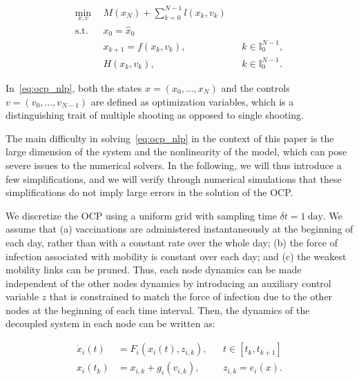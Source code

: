 \begin{subequations}
    \begin{align}
        \min_{x,v} \ \ & M(x_N)+\sum_{k=0}^{N-1} l(x_k,v_k)  \\ 
        \mathrm{s.t.} \ \ & x_0 = \hat x_0 \\
        & x_{k+1} = f(x_k,v_k), && k\in \mathbb{I}_0^{N-1}, \\
        &H(x_k,v_k), && k\in \mathbb{I}_0^{N-1}.
    \end{align}
        \label{eq:ocp_nlp}
\end{subequations}

In~\eqref{eq:ocp_nlp}, both the states $x=(x_0,\ldots,x_N)$ and the controls $v=(v_0,\ldots,v_{N-1})$ are defined as optimization variables, which is a distinguishing trait of multiple shooting as opposed to single shooting. 

The main difficulty in solving~\eqref{eq:ocp_nlp} in the context of this paper is the large dimension of the system and the nonlinearity of the model, which can pose severe issues to the numerical solvers. In the following, we will thus introduce a few simplifications, and we will verify through numerical simulations that these simplifications do not imply large errors in the solution of the OCP. 

We discretize the OCP using a uniform grid with sampling time $\delta t=1\ \mathrm{day}$. We assume that (a) vaccinations are administered instantaneously at the beginning of each day, rather than with a constant rate over the whole day; (b) the force of infection associated with mobility is constant over each day; and (c) the weakest mobility links can be pruned. Thus, each node dynamics can be made independent of the other nodes dynamics by introducing an auxiliary control variable $z$ that is constrained to match the force of infection due to the other nodes at the beginning of each time interval. Then, the dynamics of the decoupled system in each node can be written as:

\begin{align*}
    \dot x_i(t) &= F_i(x_i(t),z_{i,k}), && t\in[t_k,t_{k+1}] \\
    x_i(t_k) &= x_{i,k} + g_i(v_{i,k}), && z_{i,k} = e_i(x).
\end{align*}
